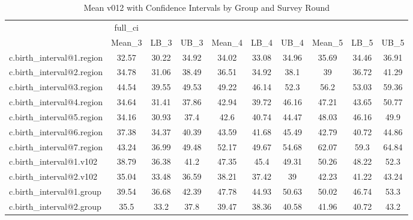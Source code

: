 \begin{table}[htbp]\centering
\caption{Mean v012 with Confidence Intervals by Group and Survey Round}
\begin{tabular}{l*{9}{c}}
\hline\hline
                    &     full\_ci&            &            &            &            &            &            &            &            \\
                    &      Mean\_3&        LB\_3&        UB\_3&      Mean\_4&        LB\_4&        UB\_4&      Mean\_5&        LB\_5&        UB\_5\\
\hline
c.birth\_interval@1.region&       32.57&       30.22&       34.92&       34.02&       33.08&       34.96&       35.69&       34.46&       36.91\\
c.birth\_interval@2.region&       34.78&       31.06&       38.49&       36.51&       34.92&        38.1&          39&       36.72&       41.29\\
c.birth\_interval@3.region&       44.54&       39.55&       49.53&       49.22&       46.14&        52.3&        56.2&       53.03&       59.36\\
c.birth\_interval@4.region&       34.64&       31.41&       37.86&       42.94&       39.72&       46.16&       47.21&       43.65&       50.77\\
c.birth\_interval@5.region&       34.16&       30.93&        37.4&        42.6&       40.74&       44.47&       48.03&       46.16&        49.9\\
c.birth\_interval@6.region&       37.38&       34.37&       40.39&       43.59&       41.68&       45.49&       42.79&       40.72&       44.86\\
c.birth\_interval@7.region&       43.24&       36.99&       49.48&       52.17&       49.67&       54.68&       62.07&        59.3&       64.84\\
c.birth\_interval@1.v102&       38.79&       36.38&        41.2&       47.35&        45.4&       49.31&       50.26&       48.22&        52.3\\
c.birth\_interval@2.v102&       35.04&       33.48&       36.59&       38.21&       37.42&          39&       42.23&       41.22&       43.24\\
c.birth\_interval@1.group&       39.54&       36.68&       42.39&       47.78&       44.93&       50.63&       50.02&       46.74&        53.3\\
c.birth\_interval@2.group&        35.5&        33.2&        37.8&       39.47&       38.36&       40.58&       41.96&       40.72&        43.2\\

\end{tabular}
\end{table}
